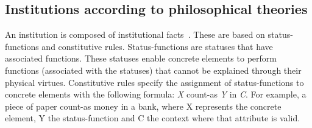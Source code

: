 \documentclass[runningheads]{llncs}
\begin{document}
\subsection{Institutions according to philosophical theories}
\label{philosophical_theories}





An institution is composed of institutional facts~\cite{searle1995construction,searle2010making}. These are based on status-functions and constitutive rules. Status-functions are statuses that have associated functions.
These statuses enable concrete elements to perform functions (associated with the statuses) that cannot be explained through their physical virtues.
Constitutive rules specify the assignment of status-functions to concrete elements with the following formula: \emph{X} count-as \emph{Y} in \emph{C}. For example, a piece of paper count-as money in a bank, where X represents the concrete element, Y the status-function and C the context where that attribute is valid. 
\end{document}

